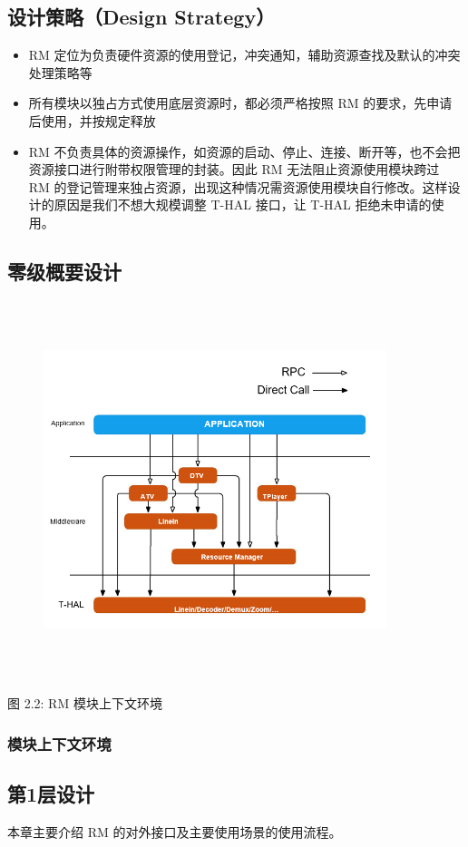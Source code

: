 \documentclass[UTF8]{ctexart}
\begin{document}
\subsection{设计策略（Design Strategy）}
      \begin{itemize}
           \item RM 定位为负责硬件资源的使用登记，冲突通知，辅助资源查找及默认的冲突处理策略等
           \item 所有模块以独占方式使用底层资源时，都必须严格按照 RM 的要求，先申请后使用，并按规定释放
           \item RM 不负责具体的资源操作，如资源的启动、停止、连接、断开等，也不会把资源接口进行附带权限管理的封装。因此 RM 无法阻止资源使用模块跨过 RM 的登记管理来独占资源，出现这种情况需资源使用模块自行修改。这样设计的原因是我们不想大规模调整 T-HAL 接口，让 T-HAL 拒绝未申请的使用。
     \end {itemize}
\subsection{零级概要设计}
\begin{figure}[h]
\centering
\includegraphics[width=10cm,height=11cm]{2.png}
\end{figure}
\centerline{{ 图 2.2: RM 模块上下文环境}}
 

\subsubsection{模块上下文环境}
\subsection{第1层设计}
   本章主要介绍 RM 的对外接口及主要使用场景的使用流程。
\end{document}
